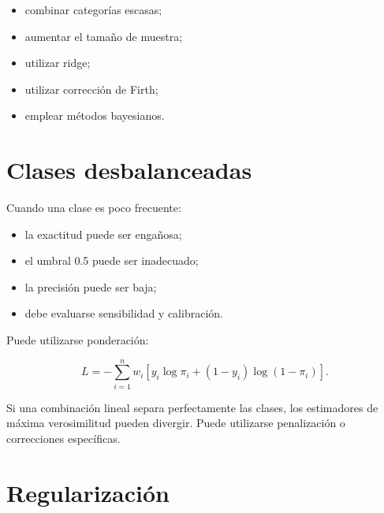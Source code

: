 \documentclass[
  spanish,
  10.5pt,
  letterpaper,
  DIV=11,
  numbers=noendperiod,
  oneside,
  open=any]{scrreprt}
\providecommand{\tightlist}{%
  \setlength{\itemsep}{0pt}\setlength{\parskip}{0pt}}
\theoremstyle{definition}
\theoremstyle{definition}
\theoremstyle{plain}
\theoremstyle{remark}
\begin{document}
\begin{itemize}
\tightlist
\item
  combinar categorías escasas;
\item
  aumentar el tamaño de muestra;
\item
  utilizar ridge;
\item
  utilizar corrección de Firth;
\item
  emplear métodos bayesianos.
\end{itemize}

\section*{Clases desbalanceadas}\label{clases-desbalanceadas}


Cuando una clase es poco frecuente:

\begin{itemize}
\tightlist
\item
  la exactitud puede ser engañosa;
\item
  el umbral 0.5 puede ser inadecuado;
\item
  la precisión puede ser baja;
\item
  debe evaluarse sensibilidad y calibración.
\end{itemize}

Puede utilizarse ponderación:

\[
L
=
-
\sum_{i=1}^{n}
w_i
\left[
y_i\log\pi_i
+
(1-y_i)\log(1-\pi_i)
\right].
\]

\begin{tcolorbox}[enhanced jigsaw, arc=.35mm, bottomrule=.15mm, bottomtitle=1mm, breakable, colback=white, colbacktitle=quarto-callout-warning-color!10!white, colframe=quarto-callout-warning-color-frame, coltitle=black, left=2mm, leftrule=.75mm, opacityback=0, opacitybacktitle=0.6, rightrule=.15mm, title=\textcolor{quarto-callout-warning-color}{\faExclamationTriangle}\hspace{0.5em}{Separación completa}, titlerule=0mm, toprule=.15mm, toptitle=1mm]

Si una combinación lineal separa perfectamente las clases, los
estimadores de máxima verosimilitud pueden divergir. Puede utilizarse
penalización o correcciones específicas.

\end{tcolorbox}

\section*{Regularización}\label{regularizaciuxf3n-2}
\end{document}
